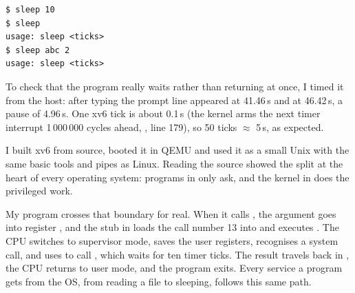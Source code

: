 \documentclass[11pt,a4paper]{article}
\begin{document}
\begin{lstlisting}
$ sleep 10
$ sleep
usage: sleep <ticks>
$ sleep abc 2
usage: sleep <ticks>
\end{lstlisting}

To check that the program really waits rather than returning at once, I timed it from the
host: after typing  the prompt line appeared at 41.46\,s and
 at 46.42\,s, a pause of 4.96\,s. One xv6 tick is about 0.1\,s (the kernel arms
the next timer interrupt 1\,000\,000 cycles ahead, , line 179), so 50 ticks
$\approx$ 5\,s, as expected.


I built xv6 from source, booted it in QEMU and used it as a small Unix with the same basic tools
and pipes as Linux. Reading the source showed the split at the heart of every operating system:
programs in  only ask, and the kernel in  does the privileged work.

My  program crosses that boundary for real. When it calls , the
argument goes into register , and the stub in  loads the call number
13 into  and executes . The CPU switches to supervisor mode,
 saves the user registers,  recognises a system call, and
 uses  to call , which waits for ten timer ticks. The
result travels back in , the CPU returns to user mode, and the program exits. Every
service a program gets from the OS, from reading a file to sleeping, follows this same path.
\end{document}
